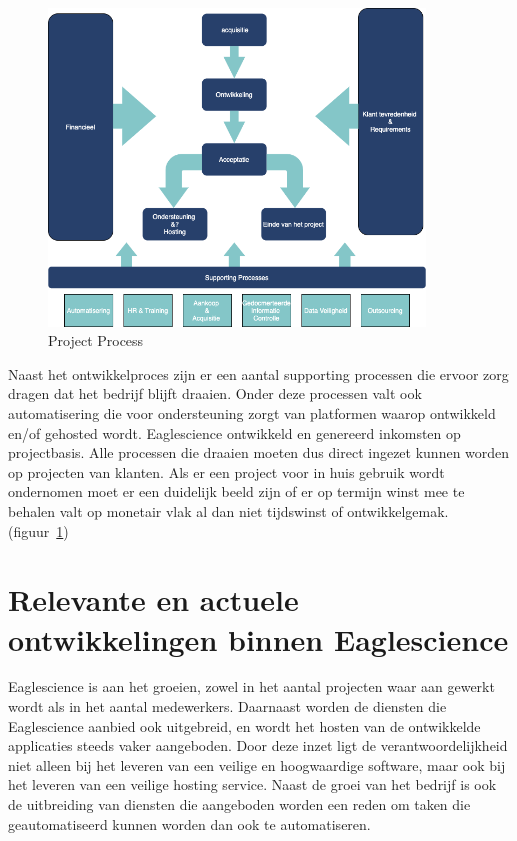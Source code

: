 \begin{figure}[bth]
\myfloatalign
\includegraphics[width=10cm]{gfx/ProcessFlow}
\caption{Project Process}
\label{fig:Project Process}
\end{figure}

Naast het ontwikkelproces zijn er een aantal supporting processen die ervoor zorg dragen dat het bedrijf blijft draaien. Onder deze processen valt ook automatisering die voor ondersteuning zorgt van platformen waarop ontwikkeld en/of gehosted wordt. Eaglescience ontwikkeld en genereerd inkomsten op projectbasis. Alle processen die draaien moeten dus direct ingezet kunnen worden op projecten van klanten. Als er een project voor in huis gebruik wordt ondernomen moet er een duidelijk beeld zijn of er op termijn winst mee te behalen valt op monetair vlak al dan niet tijdswinst of ontwikkelgemak. (figuur~\ref{fig:Project Process})

\section{Relevante en actuele ontwikkelingen binnen Eaglescience}\label{sec:relevante-en-actuele-ontwikkelingen-binnen-Eaglescience}

Eaglescience is aan het groeien, zowel in het aantal projecten waar aan gewerkt wordt als in het aantal medewerkers. Daarnaast worden de diensten die Eaglescience aanbied ook uitgebreid, en wordt het hosten van de ontwikkelde applicaties steeds vaker aangeboden. Door deze inzet ligt de verantwoordelijkheid niet alleen bij het leveren van een veilige en hoogwaardige software, maar ook bij het leveren van een veilige hosting service. Naast de groei van het bedrijf is ook de uitbreiding van diensten die aangeboden worden een reden om taken die geautomatiseerd kunnen worden dan ook te automatiseren.


